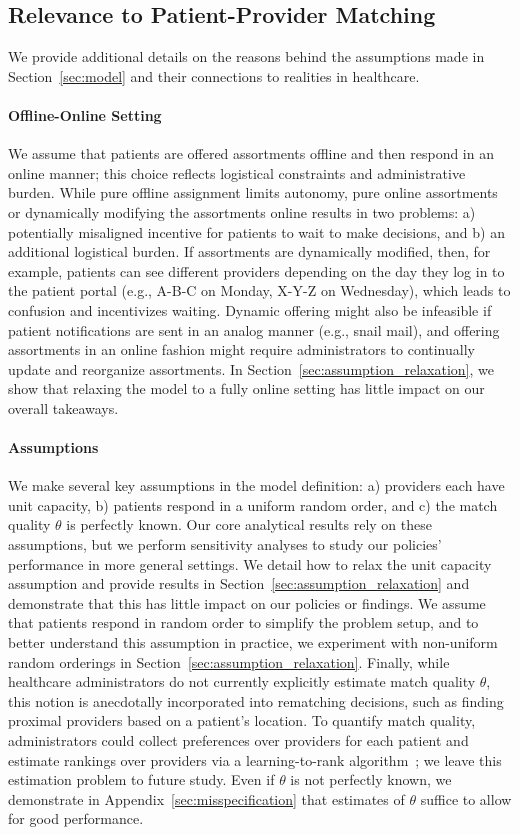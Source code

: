 \documentclass[11pt]{article}
\begin{document}
\subsection{Relevance to Patient-Provider Matching}
\label{sec:assumption_details}
We provide additional details on the reasons behind the assumptions made in Section~\ref{sec:model} and their connections to realities in healthcare. 

\paragraph{Offline-Online Setting} 
We assume that patients are offered assortments offline and then respond in an online manner; this choice reflects logistical constraints and administrative burden.
While pure offline assignment limits autonomy, pure online assortments or dynamically modifying the assortments online results in two problems: a) potentially misaligned incentive for patients to wait to make decisions, and b) an additional logistical burden. 
If assortments are dynamically modified, then, for example, patients can see different providers depending on the day they log in to the patient portal (e.g., A-B-C on Monday, X-Y-Z on Wednesday), which leads to confusion and incentivizes waiting. 
Dynamic offering might also be infeasible if patient notifications are sent in an analog manner (e.g., snail mail), and offering assortments in an online fashion might require administrators to continually update and reorganize assortments.
In Section~\ref{sec:assumption_relaxation}, we show that relaxing the model to a fully online setting has little impact on our overall takeaways.

\paragraph{Assumptions} 
We make several key assumptions in the model definition: a) providers each have unit capacity, b) patients respond in a uniform random order, and c) the match quality $\theta$ is perfectly known. 
Our core analytical results rely on these assumptions, but we perform sensitivity analyses to study our policies' performance in more general settings. We detail how to relax the unit capacity assumption and provide results in Section~\ref{sec:assumption_relaxation} and demonstrate that this has little impact on our policies or findings. 
We assume that patients respond in random order to simplify the problem setup, and to better understand this assumption in practice, we experiment with non-uniform random orderings in Section~\ref{sec:assumption_relaxation}. 
Finally, while healthcare administrators do not currently explicitly estimate match quality $\theta$, this notion is anecdotally incorporated into rematching decisions, such as finding proximal providers based on a patient's location. To quantify match quality, administrators could collect preferences over providers for each patient and estimate rankings over providers via a learning-to-rank algorithm~\citep{learning_to_rank}; we leave this estimation problem to future study. 
Even if $\theta$ is not perfectly known, we demonstrate in Appendix~\ref{sec:misspecification} that estimates of $\theta$ suffice to allow for good performance. 
\end{document}
